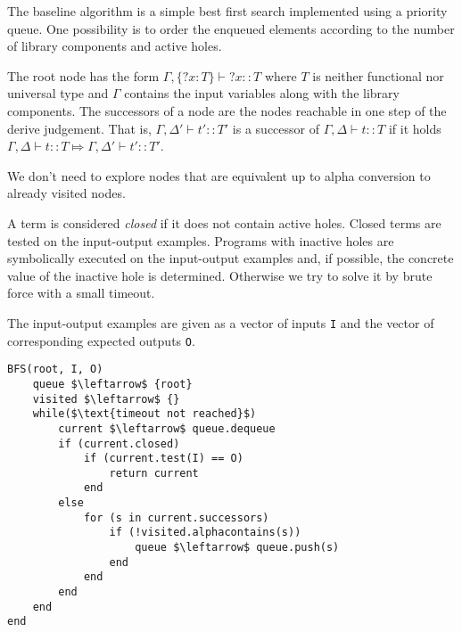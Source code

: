 The baseline algorithm is a simple best first search implemented using a priority queue. One possibility is to order the enqueued elements according to the number of library components and active holes.

The root node has the form $\Gamma, \{?x:T\} \vdash ?x :: T$ where $T$ is neither functional nor universal type and $\Gamma$ contains the input variables along with the library components.
The successors of a node are the nodes reachable in one step of the derive judgement. That is, $\Gamma, \Delta' \vdash t' :: T'$ is a successor of $\Gamma, \Delta \vdash t :: T$ if it holds $\Gamma, \Delta \vdash t :: T \Mapsto \Gamma, \Delta' \vdash t' :: T'$.

We don't need to explore nodes that are equivalent up to alpha conversion to already visited nodes.

A term is considered \emph{closed} if it does not contain active holes. Closed terms are tested on the input-output examples. Programs with inactive holes are symbolically executed on the input-output examples and, if possible, the concrete value of the inactive hole is determined. Otherwise we try to solve it by brute force with a small timeout.

The input-output examples are given as a vector of inputs \lstinline?I? and the vector of corresponding expected outputs \lstinline?O?.

\begin{lstlisting}[mathescape]
BFS(root, I, O)
	queue $\leftarrow$ {root}
	visited $\leftarrow$ {}
	while($\text{timeout not reached}$)
		current $\leftarrow$ queue.dequeue
		if (current.closed)
			if (current.test(I) == O)
				return current
			end
		else
			for (s in current.successors)
				if (!visited.alphacontains(s))
					queue $\leftarrow$ queue.push(s)
				end
			end
		end
	end
end
\end{lstlisting}




